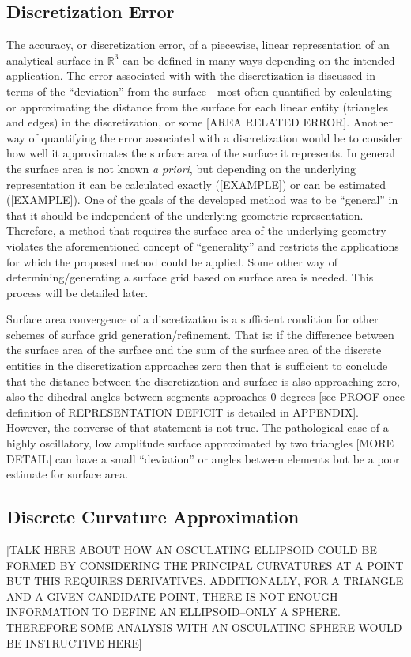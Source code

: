 \subsection{Discretization Error}
The accuracy, or discretization error, of a piecewise, linear representation of an analytical surface in ${\mathbb R}^3$ can be defined in many ways depending on the intended application. The error associated with with the discretization is discussed in terms of the ``deviation'' from the surface---most often quantified by calculating or approximating the distance from the surface for each linear entity (triangles and edges) in the discretization, or some [AREA RELATED ERROR]. Another way of quantifying the error associated with a discretization would be to consider how well it approximates the surface area of the surface it represents. In general the surface area is not known {\it a priori}, but depending on the underlying representation it can be calculated exactly ([EXAMPLE]) or can be estimated ([EXAMPLE]). One of the goals of the developed method was to be ``general'' in that it should be independent of the underlying geometric representation. Therefore, a method that requires the surface area of the underlying geometry violates the aforementioned concept of ``generality'' and restricts the applications for which the proposed method could be applied. Some other way of determining/generating a surface grid based on surface area is needed. This process will be detailed later.

Surface area convergence of a discretization is a sufficient condition for other schemes of surface grid generation/refinement. That is: if the difference between the surface area of the surface and the sum of the surface area of the discrete entities in the discretization approaches zero then that is sufficient to conclude that the distance between the discretization and surface is also approaching zero, also the dihedral angles between segments approaches $0$ degrees [see PROOF once definition of REPRESENTATION DEFICIT is detailed in APPENDIX]. However, the converse of that statement is not true. The pathological case of a highly oscillatory, low amplitude surface approximated by two triangles [MORE DETAIL] can have a small ``deviation'' or angles between elements but be a poor estimate for surface area.

\subsection{Discrete Curvature Approximation}
[TALK HERE ABOUT HOW AN OSCULATING ELLIPSOID COULD BE FORMED BY CONSIDERING THE PRINCIPAL CURVATURES AT A POINT BUT THIS REQUIRES DERIVATIVES. ADDITIONALLY, FOR A TRIANGLE AND A GIVEN CANDIDATE POINT, THERE IS NOT ENOUGH INFORMATION TO DEFINE AN ELLIPSOID--ONLY A SPHERE. THEREFORE SOME ANALYSIS WITH AN OSCULATING SPHERE WOULD BE INSTRUCTIVE HERE]

